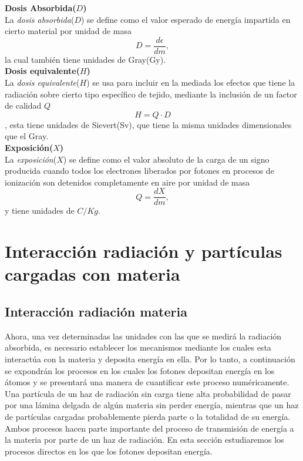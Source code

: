\noindent
\textbf{Dosis Absorbida($D$)}\\

La \textit{dosis absorbida}($D$) se define como el valor esperado de energía impartida en cierto material por unidad de masa
\begin{equation}
	D=\frac{d\epsilon}{dm},
\end{equation}
la cual también tiene unidades de Gray(Gy).\\

\noindent
\textbf{Dosis equivalente($H$)}\\

La \textit{dosis equivalente}($H$) se usa para incluir en la mediada los efectos que tiene la radiación sobre cierto tipo específico de tejido, mediante la inclusión de un factor de calidad $Q$
\begin{equation}
	H=Q\cdot D
\end{equation},
esta tiene unidades de Sievert(Sv), que tiene la misma unidades dimensionales que el Gray.\\

\noindent
\textbf{Exposición($X$)}\\

La \textit{exposición}($X$) se define como el valor absoluto de la carga de un signo producida cuando todos los electrones liberados por fotones en procesos de ionización son detenidos completamente en aire por unidad de masa
\begin{equation}
Q=\frac{dX}{dm},
\end{equation}
y tiene unidades de $C/Kg$.

\section{Interacción radiación y partículas cargadas con materia}
\subsection{Interacción radiación materia}
Ahora, una vez determinadas las unidades con las que se medirá la radiación absorbida, es necesario establecer los mecanismos mediante los cuales esta interactúa con la materia y deposita energía en ella. Por lo tanto, a continuación se expondrán los procesos en los cuales los fotones depositan energía en los átomos y se presentará una manera de cuantificar este proceso numéricamente.  \\

Una partícula de un haz de radiación sin carga tiene alta probabilidad de pasar por una lámina delgada de algún materia sin perder energía, mientras que un haz de partículas cargadas probablemente pierda parte o la totalidad de su energía. Ambos procesos hacen parte importante del proceso de transmisión de energía a la materia por parte de un haz de radiación. En esta sección estudiaremos los procesos directos en los que los fotones depositan energía.\\

